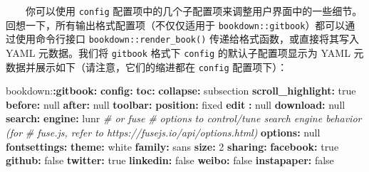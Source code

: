 \documentclass[
  12pt,
]{krantz}
\newenvironment{Shaded}{\begin{snugshade}}{\end{snugshade}}
\newcommand{\AttributeTok}[1]{\textcolor[rgb]{0.13,0.29,0.53}{#1}}
\newcommand{\CharTok}[1]{\textcolor[rgb]{0.31,0.60,0.02}{#1}}
\newcommand{\CommentTok}[1]{\textcolor[rgb]{0.56,0.35,0.01}{\textit{#1}}}
\newcommand{\DecValTok}[1]{\textcolor[rgb]{0.00,0.00,0.81}{#1}}
\newcommand{\FunctionTok}[1]{\textcolor[rgb]{0.13,0.29,0.53}{\textbf{#1}}}
\newcommand{\KeywordTok}[1]{\textcolor[rgb]{0.13,0.29,0.53}{\textbf{#1}}}
\theoremstyle{definition}
\theoremstyle{definition}
\theoremstyle{definition}
\theoremstyle{definition}
\theoremstyle{remark}
\begin{document}
  你可以使用 \texttt{config} 配置项中的几个子配置项来调整用户界面中的一些细节。回想一下，所有输出格式配置项（不仅仅适用于 \texttt{bookdown::gitbook}）都可以通过使用命令行接口 \texttt{bookdown::render\_book()} 传递给格式函数，或直接将其写入 YAML 元数据。我们将 \texttt{gitbook} 格式下 \texttt{config} 的默认子配置项显示为 YAML 元数据并展示如下（请注意，它们的缩进都在 \texttt{config} 配置项下）：

\begin{Shaded}
\begin{Highlighting}[]
\AttributeTok{bookdown:}\FunctionTok{:gitbook}\KeywordTok{:}
\AttributeTok{  }\FunctionTok{config}\KeywordTok{:}
\AttributeTok{    }\FunctionTok{toc}\KeywordTok{:}
\AttributeTok{      }\FunctionTok{collapse}\KeywordTok{:}\AttributeTok{ subsection}
\AttributeTok{      }\FunctionTok{scroll\_highlight}\KeywordTok{:}\AttributeTok{ }\CharTok{true}
\AttributeTok{      }\FunctionTok{before}\KeywordTok{:}\AttributeTok{ }\CharTok{null}
\AttributeTok{      }\FunctionTok{after}\KeywordTok{:}\AttributeTok{ }\CharTok{null}
\AttributeTok{    }\FunctionTok{toolbar}\KeywordTok{:}
\AttributeTok{      }\FunctionTok{position}\KeywordTok{:}\AttributeTok{ fixed}
\AttributeTok{    }\FunctionTok{edit }\KeywordTok{:}\AttributeTok{ }\CharTok{null}
\AttributeTok{    }\FunctionTok{download}\KeywordTok{:}\AttributeTok{ }\CharTok{null}
\AttributeTok{    }\FunctionTok{search}\KeywordTok{:}
\AttributeTok{      }\FunctionTok{engine}\KeywordTok{:}\AttributeTok{ lunr}\CommentTok{ \# or fuse}
\CommentTok{      \# options to control/tune search engine behavior (for}
\CommentTok{      \# fuse.js, refer to https://fusejs.io/api/options.html)}
\AttributeTok{      }\FunctionTok{options}\KeywordTok{:}\AttributeTok{ }\CharTok{null}
\AttributeTok{    }\FunctionTok{fontsettings}\KeywordTok{:}
\AttributeTok{      }\FunctionTok{theme}\KeywordTok{:}\AttributeTok{ white}
\AttributeTok{      }\FunctionTok{family}\KeywordTok{:}\AttributeTok{ sans}
\AttributeTok{      }\FunctionTok{size}\KeywordTok{:}\AttributeTok{ }\DecValTok{2}
\AttributeTok{    }\FunctionTok{sharing}\KeywordTok{:}
\AttributeTok{      }\FunctionTok{facebook}\KeywordTok{:}\AttributeTok{ }\CharTok{true}
\AttributeTok{      }\FunctionTok{github}\KeywordTok{:}\AttributeTok{ }\CharTok{false}
\AttributeTok{      }\FunctionTok{twitter}\KeywordTok{:}\AttributeTok{ }\CharTok{true}
\AttributeTok{      }\FunctionTok{linkedin}\KeywordTok{:}\AttributeTok{ }\CharTok{false}
\AttributeTok{      }\FunctionTok{weibo}\KeywordTok{:}\AttributeTok{ }\CharTok{false}
\AttributeTok{      }\FunctionTok{instapaper}\KeywordTok{:}\AttributeTok{ }\CharTok{false}

\end{Highlighting}
\end{Shaded}
\end{document}
